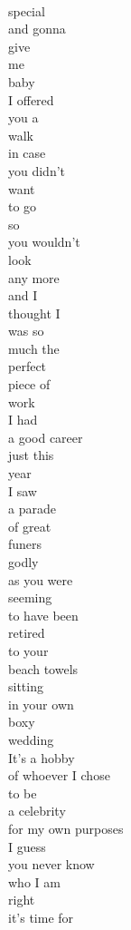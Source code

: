 \documentclass[smalldemyvopaper,11pt,twoside,onecolumn,openright,extrafontsizes]{memoir}
\begin{document}
\\special
\\and gonna
\\give
\\me
\\baby
\\I offered
\\you a
\\walk
\\in case
\\you didn't
\\want
\\to go
\\so
\\you wouldn't
\\look
\\any more
\\and I
\\thought I
\\was so
\\much the
\\perfect
\\piece of
\\work
\\I had
\\a good career
\\just this
\\year
\\I saw
\\a parade
\\of great
\\funers
\\godly
\\as you were
\\seeming
\\to have been
\\retired
\\to your
\\beach towels
\\sitting
\\in your own
\\boxy
\\wedding
\\It's a hobby
\\of whoever I chose
\\to be
\\a celebrity
\\for my own purposes
\\I guess
\\you never know
\\who I am
\\right
\\it's time for
\end{document}
